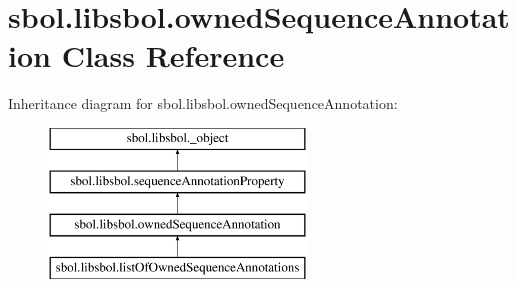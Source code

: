 \hypertarget{classsbol_1_1libsbol_1_1owned_sequence_annotation}{}\section{sbol.\+libsbol.\+owned\+Sequence\+Annotation Class Reference}
\label{classsbol_1_1libsbol_1_1owned_sequence_annotation}
Inheritance diagram for sbol.\+libsbol.\+owned\+Sequence\+Annotation\+:\begin{figure}[H]
\begin{center}
\leavevmode
\includegraphics[height=4.000000cm]{classsbol_1_1libsbol_1_1owned_sequence_annotation}
\end{center}
\end{figure}

